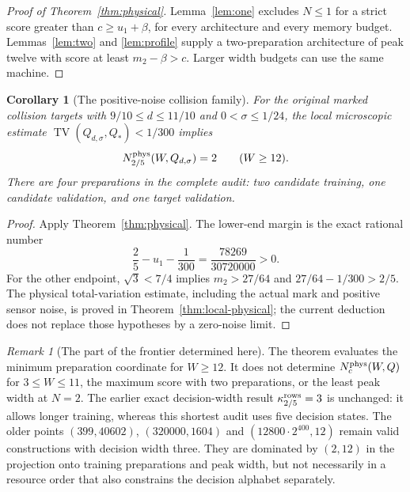\documentclass[11pt]{amsart}
\newtheorem{corollary}[theorem]{Corollary}
\theoremstyle{definition}\newtheorem{definition}[theorem]{Definition}
\theoremstyle{remark}\newtheorem{remark}[theorem]{Remark}
\newcommand{\TV}{\operatorname{TV}}
\newcommand{\1}{\mathbf 1}
\newcommand{\Qstar}{Q_*}
\begin{document}
\begin{proof}[Proof of Theorem~\ref{thm:physical}]
Lemma~\ref{lem:one} excludes $N\le1$ for a strict score greater than
$c\ge u_1+\beta$, for every architecture and every memory budget.
Lemmas~\ref{lem:two} and \ref{lem:profile} supply a two-preparation
architecture of peak twelve with score at least $m_2-\beta>c$.
Larger width budgets can use the same machine.
\end{proof}

\begin{corollary}[The positive-noise collision family]\label{cor:collision}
For the original marked collision targets with
$9/10\le d\le11/10$ and $0<\sigma\le1/24$, the local microscopic
estimate $\TV(Q_{d,\sigma},\Qstar)<1/300$ implies
\[
             N_{2/5}^{\rm phys}(W,Q_{d,\sigma})=2
                         \qquad(W\ge12).
\]
There are four preparations in the complete audit: two candidate training,
one candidate validation, and one target validation.
\end{corollary}
\begin{proof}
Apply Theorem~\ref{thm:physical}. The lower-end margin is the exact rational
number
\[
 \frac25-u_1-\frac1{300}=\frac{78269}{30720000}>0.
\]
For the other endpoint, $\sqrt3<7/4$ implies
$m_2>27/64$ and $27/64-1/300>2/5$.
The physical total-variation estimate, including the actual mark and
positive sensor noise, is proved in Theorem~\ref{thm:local-physical}; the current deduction
does not replace those hypotheses by a zero-noise limit.
\end{proof}

\begin{remark}[The part of the frontier determined here]
The theorem evaluates the minimum preparation coordinate for $W\ge12$.
It does not determine $N_c^{\rm phys}(W,Q)$ for $3\le W\le11$, the
maximum score with two preparations, or the least peak width at $N=2$.
The earlier exact decision-width result $\kappa_{2/5}^{\rm rows}=3$
is unchanged: it allows longer training, whereas this shortest audit
uses five decision states. The older points $(399,40602)$,
$(320000,1604)$ and $(12800\cdot2^{400},12)$ remain valid constructions
with decision width three. They are dominated by $(2,12)$ in the
projection onto training preparations and peak width, but not necessarily
in a resource order that also constrains the decision alphabet separately.
\end{remark}



\end{document}
